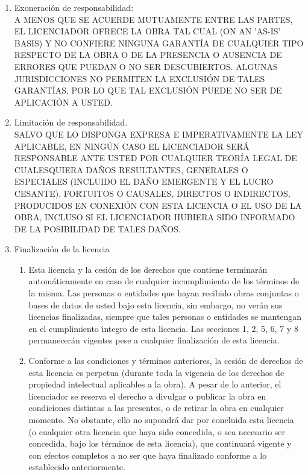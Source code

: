 \begin{enumerate}
\item Exoneraci\'on de responsabilidad:\\

  A MENOS QUE SE ACUERDE MUTUAMENTE ENTRE LAS PARTES, EL LICENCIADOR
  OFRECE LA OBRA TAL CUAL (ON AN 'AS-IS' BASIS) Y NO CONFIERE NINGUNA
  GARANT\'IA DE CUALQUIER TIPO RESPECTO DE LA OBRA O DE LA PRESENCIA O
  AUSENCIA DE ERRORES QUE PUEDAN O NO SER DESCUBIERTOS. ALGUNAS
  JURISDICCIONES NO PERMITEN LA EXCLUSI\'ON DE TALES GARANT\'IAS, POR
  LO QUE TAL EXCLUSI\'ON PUEDE NO SER DE APLICACI\'ON A USTED.

\item Limitaci\'on de responsabilidad.\\

  SALVO QUE LO DISPONGA EXPRESA E IMPERATIVAMENTE LA LEY APLICABLE, EN
  NING\'UN CASO EL LICENCIADOR SER\'A RESPONSABLE ANTE USTED POR
  CUALQUIER TEOR\'IA LEGAL DE CUALESQUIERA DA\~NOS RESULTANTES,
  GENERALES O ESPECIALES (INCLUIDO EL DA\~NO EMERGENTE Y EL LUCRO
  CESANTE), FORTUITOS O CAUSALES, DIRECTOS O INDIRECTOS, PRODUCIDOS EN
  CONEXI\'ON CON ESTA LICENCIA O EL USO DE LA OBRA, INCLUSO SI EL
  LICENCIADOR HUBIERA SIDO INFORMADO DE LA POSIBILIDAD DE TALES
  DA\~NOS.

\item Finalizaci\'on de la licencia

  \begin{enumerate}

  \item Esta licencia y la cesi\'on de los derechos que contiene
    terminar\'an autom\'aticamente en caso de cualquier incumplimiento
    de los t\'erminos de la misma.  Las personas o entidades que hayan
    recibido obras conjuntas o bases de datos de usted bajo esta
    licencia, sin embargo, no ver\'an sus licencias finalizadas,
    siempre que tales personas o entidades se mantengan en el
    cumplimiento \'\i{}ntegro de esta licencia. Las secciones 1, 2, 5,
    6, 7 y 8 permanecer\'an vigentes pese a cualquier finalizaci\'on
    de esta licencia.

  \item Conforme a las condiciones y t\'erminos anteriores, la
    cesi\'on de derechos de esta licencia es perpetua (durante toda la
    vigencia de los derechos de propiedad intelectual aplicables a la
    obra). A pesar de lo anterior, el licenciador se reserva el
    derecho a divulgar o publicar la obra en condiciones distintas a
    las presentes, o de retirar la obra en cualquier momento. No
    obstante, ello no supondr\'a dar por concluida esta licencia (o
    cualquier otra licencia que haya sido concedida, o sea necesario
    ser concedida, bajo los t\'erminos de esta licencia), que
    continuar\'a vigente y con efectos completos a no ser que haya
    finalizado conforme a lo establecido anteriormente.


\end{enumerate}
\end{enumerate}
